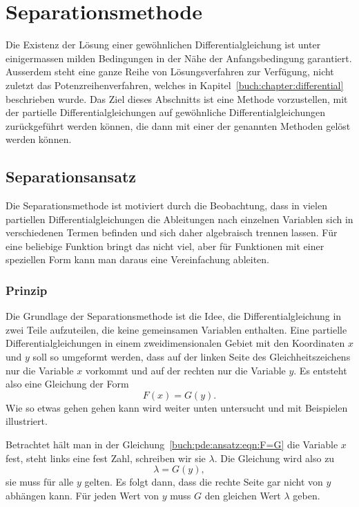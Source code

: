 %
%
%
\section{Separationsmethode
\label{buch:pde:section:separation}}
Die Existenz der Lösung einer gewöhnlichen Differentialgleichung
ist unter einigermassen milden Bedingungen in der Nähe der
Anfangsbedingung garantiert.
Ausserdem steht eine ganze Reihe von Lösungsverfahren zur
Verfügung, nicht zuletzt das Potenzreihenverfahren, welches in
Kapitel~\ref{buch:chapter:differential} beschrieben wurde.
Das Ziel dieses Abschnitts ist eine Methode vorzustellen, mit
der partielle Differentialgleichungen auf gewöhnliche
Differentialgleichungen zurückgeführt werden können,
die dann mit einer der genannten Methoden gelöst werden können.

%
%
\subsection{Separationsansatz}
Die Separationsmethode ist motiviert durch die Beobachtung, dass in
vielen partiellen Differentialgleichungen die Ableitungen nach
einzelnen Variablen sich in verschiedenen Termen befinden und
sich daher algebraisch trennen lassen.
Für eine beliebige Funktion bringt das nicht viel, aber für
Funktionen mit einer speziellen Form kann man daraus eine Vereinfachung
ableiten.

%
%
\subsubsection{Prinzip}
Die Grundlage der Separationsmethode ist die Idee, die Differentialgleichung
in zwei Teile aufzuteilen, die keine gemeinsamen Variablen enthalten.
Eine partielle Differentialgleichungen in einem zweidimensionalen
Gebiet mit den Koordinaten $x$ und $y$ soll so umgeformt
werden, dass auf der linken Seite des Gleichheitszeichens nur
die Variable $x$ vorkommt und auf der rechten nur die Variable $y$.
Es entsteht also eine Gleichung der Form
\begin{equation}
F(x) = G(y).
\label{buch:pde:ansatz:eqn:F=G}
\end{equation}
Wie so etwas gehen gehen kann wird weiter unten untersucht und
mit Beispielen illustriert.

Betrachtet hält man in der Gleichung~\eqref{buch:pde:ansatz:eqn:F=G}
die Variable $x$ fest, steht links eine fest Zahl, schreiben wir 
sie $\lambda$.
Die Gleichung wird also zu
\[
\lambda = G(y),
\]
sie muss für alle $y$ gelten.
Es folgt dann, dass die rechte Seite gar nicht von $y$ abhängen kann.
Für jeden Wert von $y$ muss $G$ den gleichen Wert $\lambda$ geben.

